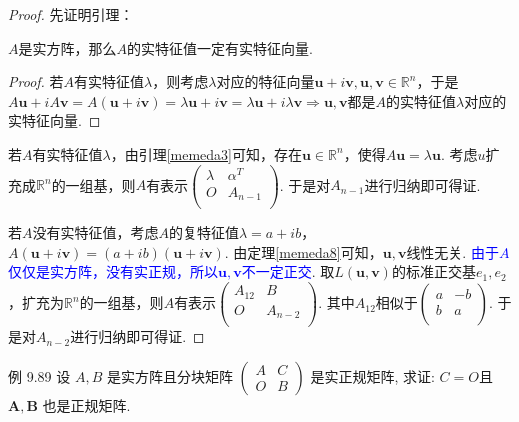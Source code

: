 \begin{proof}
    先证明引理：
    \begin{lemma}[实特征值一定有实特征向量]\label{memeda3}
        $A$是实方阵，那么$A$的实特征值一定有实特征向量.
    \end{lemma}

    \begin{proof}
        若$A$有实特征值$\lambda$，则考虑$\lambda$对应的特征向量$\boldsymbol{u}+i\boldsymbol{v},\boldsymbol{u},\boldsymbol{v}\in \mathbb{R}^n$，于是$A\boldsymbol{u}+iA\boldsymbol{v}=A(\boldsymbol{u}+i\boldsymbol{v})=\lambda{\boldsymbol{u}+i\boldsymbol{v}}=\lambda\boldsymbol{u}+i\lambda\boldsymbol{v}\Rightarrow \boldsymbol{u},\boldsymbol{v}$都是$A$的实特征值$\lambda$对应的实特征向量.
    \end{proof}

    若$A$有实特征值$\lambda$，由引理\cref{memeda3}可知，存在$\boldsymbol{u}\in \mathbb{R}^n$，使得$A\boldsymbol{u}=\lambda\boldsymbol{u}$. 考虑$u$扩充成$\mathbb{R}^n$的一组基，则$A$有表示$\begin{pmatrix}
            \lambda & \alpha^T \\
            O       & A_{n-1}  \\
        \end{pmatrix}$. 于是对$A_{n-1}$进行归纳即可得证.

    若$A$没有实特征值，考虑$A$的复特征值$\lambda=a+ib$，$A(\boldsymbol{u}+i\boldsymbol{v})=(a+ib)(\boldsymbol{u}+i\boldsymbol{v})$. 由定理\cref{memeda8}可知，$\boldsymbol{u},\boldsymbol{v}$线性无关. \textcolor{blue}{由于$A$仅仅是实方阵，没有实正规，所以$\boldsymbol{u},\boldsymbol{v}$不一定正交}. 取$L(\boldsymbol{u},\boldsymbol{v})$的标准正交基$e_1,e_2$，扩充为$\mathbb{R}^n$的一组基，则$A$有表示$\begin{pmatrix}
            A_{12} & B       \\
            O      & A_{n-2} \\
        \end{pmatrix}$. 其中$A_{12}$相似于$\begin{pmatrix}
            a & -b \\
            b & a  \\
        \end{pmatrix}$. 于是对$A_{n-2}$进行归纳即可得证.
\end{proof}

\begin{theorem}[正规矩阵有分块对角形式]\label{例 9.89}
    例 9.89 设 $A, B$ 是实方阵且分块矩阵 $\left(\begin{array}{cc}A & C \\ O & B\end{array}\right)$ 是实正规矩阵, 求证: $C=O$且 $\boldsymbol{A}, \boldsymbol{B}$ 也是正规矩阵.
\end{theorem}

